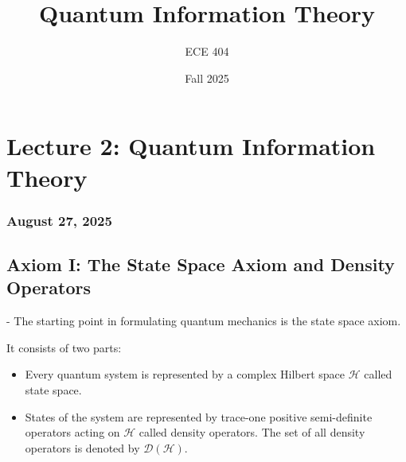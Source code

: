 \documentclass{article}
\title{Quantum Information Theory}
\author{ECE 404}
\date{Fall 2025}
\begin{document}
\maketitle

\newpage
\tableofcontents
\newpage

\section{Lecture 2: Quantum Information Theory}
\subsubsection*{August 27, 2025}

\subsection{Axiom I: The State Space Axiom and Density Operators}
\begin{conceptbox}
- The starting point in formulating quantum mechanics is the state space axiom.

It consists of two parts:
\begin{itemize}
    \item Every quantum system is represented by a complex Hilbert space $\mathcal{H}$ called state space.
    \item States of the system are represented by trace-one positive semi-definite operators acting on $\mathcal{H}$ called density operators. The set of all density operators is denoted by $\mathcal{D}(\mathcal{H})$.
\end{itemize} 
\end{conceptbox}
\end{document}
